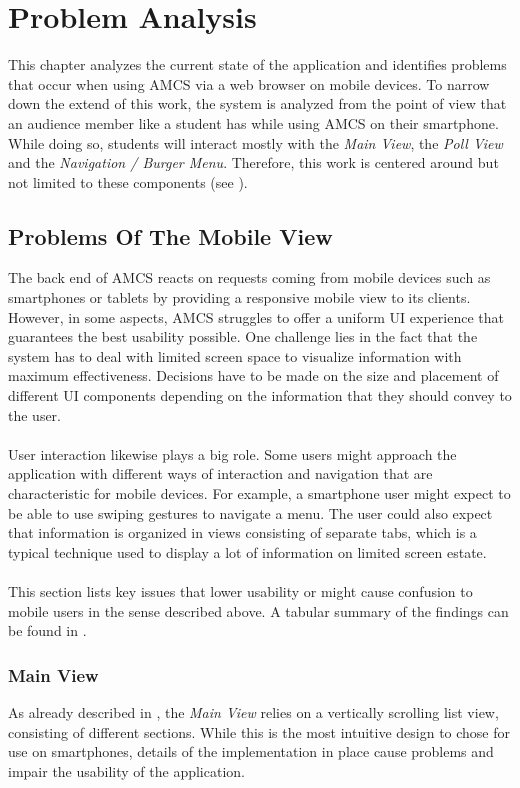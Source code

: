 \chapter{Problem Analysis}
\label{chapter:concept}
This chapter analyzes the current state of the application and identifies problems that occur when using AMCS via a web browser on mobile
devices. To narrow down the extend of this work, the system is analyzed from the point of view that an audience member like a student has while using AMCS on their smartphone. While doing so, students will interact mostly with the \emph{Main View}, the \emph{Poll View} and the \emph{Navigation / Burger Menu}. Therefore, this work is centered around but not limited to these components (see ).

\section{Problems Of The Mobile View}
\label{section:con:problems}
The back end of AMCS reacts on requests coming from mobile devices such as smartphones or tablets by providing a responsive mobile view to its clients. However, in some aspects, AMCS struggles to offer a uniform UI experience that guarantees the best usability possible.
One challenge lies in the fact that the system has to deal with limited screen space to visualize information with maximum effectiveness. Decisions have to be made on the size and placement of different UI components depending on the information that they should convey to the user.
\\
\\
User interaction likewise plays a big role. Some users might approach the application with different ways of interaction and navigation that are characteristic for mobile devices. For example, a smartphone user might expect to be able to use swiping gestures to navigate a menu. The user could also expect that information is organized in views consisting of separate tabs, which is a typical technique used to display a lot of information on limited screen estate.
\\
\\ 
This section lists key issues that lower usability or might cause confusion to mobile users in the sense described above. A tabular summary of the findings can be found in .

\subsection{Main View}
As already described in , the \emph{Main View} relies on a vertically scrolling list view, consisting of different sections. While this is the most intuitive design to chose for use on smartphones, details of the implementation in place cause problems and impair the usability of the application.

